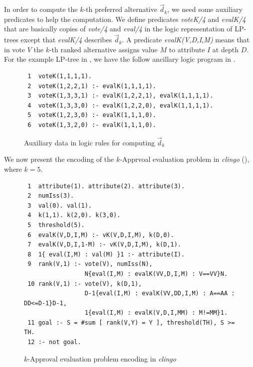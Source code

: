 In order to compute the $k$-th preferred alternative $\vec{d}_k$, we need
some auxiliary predicates to help the computation.  We define predicates
\textit{voteK/4} and \textit{evalK/4} that are basically copies 
of \textit{vote/4} and \textit{eval/4} in
the logic representation of LP-trees except that \textit{evalK/4} describes
$\vec{d}_k$.  A predicate \textit{evalK(V,D,I,M)} means that in vote $V$
the $k$-th ranked alternative assigns value $M$ to attribute $I$ at depth $D$.
For the example LP-tree in , we have the follow ancillary
logic program in .

\begin{figure}[H]
   \small
	\begin{framed}
		\begin{verbatim}
 1  voteK(1,1,1,1).
 2  voteK(1,2,2,1) :- evalK(1,1,1,1).
 3  voteK(1,3,3,1) :- evalK(1,2,2,1), evalK(1,1,1,1).
 4  voteK(1,3,3,0) :- evalK(1,2,2,0), evalK(1,1,1,1).
 5  voteK(1,2,3,0) :- evalK(1,1,1,0).
 6  voteK(1,3,2,0) :- evalK(1,1,1,0).
		\end{verbatim}
	\end{framed}
	\caption{Auxiliary data in logic rules for computing $\vec{d}_k$ }
  \label{fig:LPTreeASP_aux}
\end{figure}

We now present the encoding of the $k$-Apprvoal evaluation problem in \emph{clingo}
(), where $k=5$.
\begin{figure}[ht]
  \centering
	\begin{framed}
	\small
		\begin{verbatim}
 1  attribute(1). attribute(2). attribute(3).
 2  numIss(3).
 3  val(0). val(1).
 4  k(1,1). k(2,0). k(3,0).
 5  threshold(5).
 6  evalK(V,D,I,M) :- vK(V,D,I,M), k(D,0).
 7  evalK(V,D,I,1-M) :- vK(V,D,I,M), k(D,1).
 8  1{ eval(I,M) : val(M) }1 :- attribute(I).
 9  rank(V,1) :- vote(V), numIss(N),
                 N{eval(I,M) : evalK(VV,D,I,M) : V==VV}N.
 10 rank(V,1) :- vote(V), k(D,1), 
                 D-1{eval(I,M) : evalK(VV,DD,I,M) : A==AA : DD<=D-1}D-1,
                 1{eval(I,M) : evalK(V,D,I,MM) : M!=MM}1.
 11 goal :- S = #sum [ rank(V,Y) = Y ], threshold(TH), S >= TH.
 12 :- not goal.
		\end{verbatim}
	\end{framed}
	\caption{$k$-Approval evaluation problem encoding in \emph{clingo}}
	\label{fig:clingo:kEval}
\end{figure}


